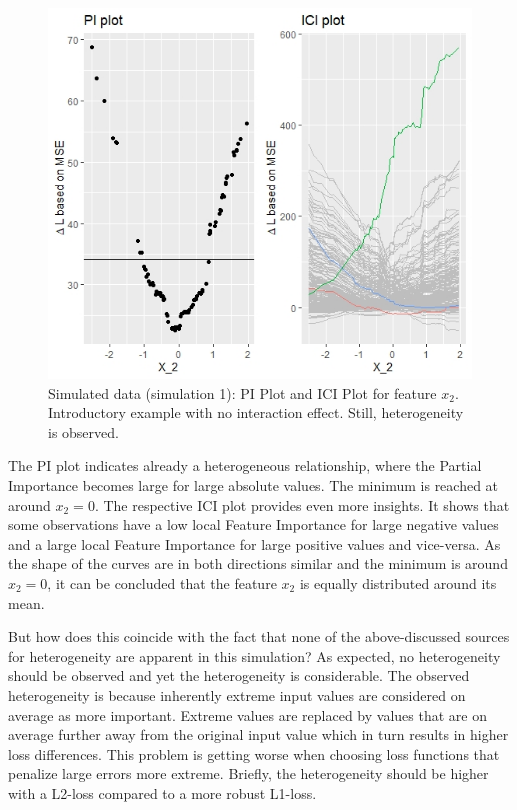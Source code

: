 \documentclass[
]{krantz}
\begin{document}
\begin{figure}

{\centering \includegraphics[width=0.99\linewidth]{images/03-7-1} 

}

\caption{Simulated data (simulation 1): PI Plot and ICI Plot for feature $x_{2}$. Introductory example with no interaction effect. Still, heterogeneity is observed.}\label{fig:fig1}
\end{figure}

The PI plot indicates already a heterogeneous relationship, where the Partial Importance becomes large for large absolute values. The minimum is reached at around \(x_{2} = 0\). The respective ICI plot provides even more insights. It shows that some observations have a low local Feature Importance for large negative values and a large local Feature Importance for large positive values and vice-versa. As the shape of the curves are in both directions similar and the minimum is around \(x_{2} = 0\), it can be concluded that the feature \(x_{2}\) is equally distributed around its mean.

But how does this coincide with the fact that none of the above-discussed sources for heterogeneity are apparent in this simulation? As expected, no heterogeneity should be observed and yet the heterogeneity is considerable. The observed heterogeneity is because inherently extreme input values are considered on average as more important. Extreme values are replaced by values that are on average further away from the original input value which in turn results in higher loss differences. This problem is getting worse when choosing loss functions that penalize large errors more extreme. Briefly, the heterogeneity should be higher with a L2-loss compared to a more robust L1-loss.
\end{document}
